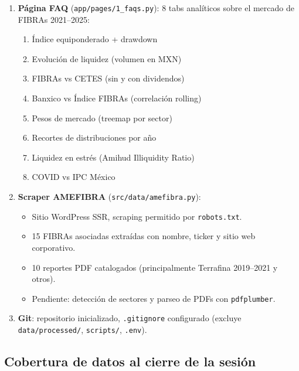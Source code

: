 \documentclass[12pt, a4paper]{article}
\begin{document}
\begin{enumerate}
  \item \textbf{P\'{a}gina FAQ} (\texttt{app/pages/1\_faqs.py}): 8 tabs anal\'{i}ticos
        sobre el mercado de FIBRAs 2021--2025:
        \begin{enumerate}[label=\arabic*.]
          \item \'{I}ndice equiponderado + drawdown
          \item Evoluci\'{o}n de liquidez (volumen en MXN)
          \item FIBRAs vs CETES (sin y con dividendos)
          \item Banxico vs \'{I}ndice FIBRAs (correlaci\'{o}n rolling)
          \item Pesos de mercado (treemap por sector)
          \item Recortes de distribuciones por a\~{n}o
          \item Liquidez en estr\'{e}s (Amihud Illiquidity Ratio)
          \item COVID vs IPC M\'{e}xico
        \end{enumerate}

  \item \textbf{Scraper AMEFIBRA} (\texttt{src/data/amefibra.py}):
        \begin{itemize}
          \item Sitio WordPress SSR, scraping permitido por \texttt{robots.txt}.
          \item 15 FIBRAs asociadas extra\'{i}das con nombre, ticker y sitio web corporativo.
          \item 10 reportes PDF catalogados (principalmente Terrafina 2019--2021 y otros).
          \item Pendiente: detecci\'{o}n de sectores y parseo de PDFs con \texttt{pdfplumber}.
        \end{itemize}

  \item \textbf{Git}: repositorio inicializado, \texttt{.gitignore} configurado
        (excluye \texttt{data/processed/}, \texttt{scripts/}, \texttt{.env}).

\end{enumerate}

\subsection{Cobertura de datos al cierre de la sesi\'{o}n}
\end{document}
